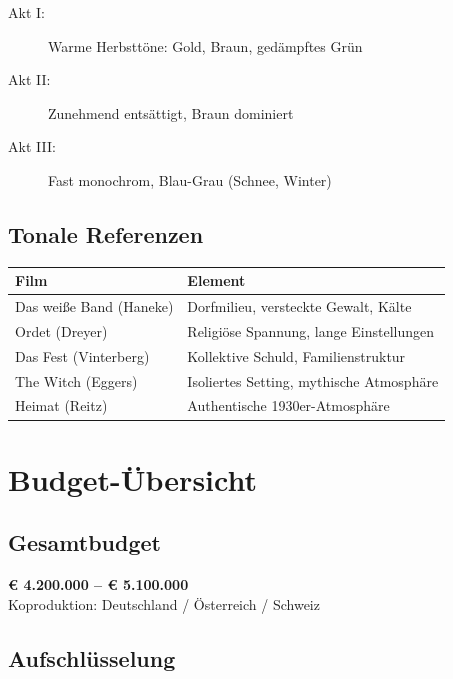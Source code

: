 \documentclass[11pt,a4paper,twoside]{book}
\begin{document}
\begin{description}
    \item[Akt I:] Warme Herbsttöne: Gold, Braun, gedämpftes Grün
    \item[Akt II:] Zunehmend entsättigt, Braun dominiert
    \item[Akt III:] Fast monochrom, Blau-Grau (Schnee, Winter)
\end{description}

\section{Tonale Referenzen}

\begin{tabularx}{\textwidth}{lX}
\toprule
\textbf{Film} & \textbf{Element} \\
\midrule
Das weiße Band (Haneke) & Dorfmilieu, versteckte Gewalt, Kälte \\
Ordet (Dreyer) & Religiöse Spannung, lange Einstellungen \\
Das Fest (Vinterberg) & Kollektive Schuld, Familienstruktur \\
The Witch (Eggers) & Isoliertes Setting, mythische Atmosphäre \\
Heimat (Reitz) & Authentische 1930er-Atmosphäre \\
\bottomrule
\end{tabularx}

\chapter{Budget-Übersicht}

\section{Gesamtbudget}

\begin{tcolorbox}
\centering
{\Large\textbf{€ 4.200.000 -- € 5.100.000}}\\[0.5em]
Koproduktion: Deutschland / Österreich / Schweiz
\end{tcolorbox}

\section{Aufschlüsselung}
\end{document}
